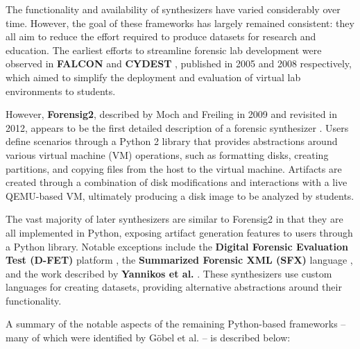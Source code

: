 The functionality and availability of synthesizers have varied
considerably over time. However, the goal of these frameworks has
largely remained consistent: they all aim to reduce the effort required
to produce datasets for research and education. The earliest efforts to
streamline forensic lab development were observed in \textbf{FALCON}
\citep{adelsteinAutomaticallyCreatingRealistic2005} and
\textbf{CYDEST} \citep{bruecknerAutomatedComputerForensics2008},
published in 2005 and 2008 respectively, which aimed to simplify the
deployment and evaluation of virtual lab environments to students.

However, \textbf{Forensig2}, described by Moch and Freiling in 2009 and
revisited in 2012, appears to be the first detailed description of a
forensic synthesizer
\citep{mochForensicImageGenerator2009,mochEvaluatingForensicImage2012}.
Users define scenarios through a Python 2 library that provides
abstractions around various virtual machine (VM) operations, such as
formatting disks, creating partitions, and copying files from the host
to the virtual machine. Artifacts are created through a combination of
disk modifications and interactions with a live QEMU-based VM,
ultimately producing a disk image to be analyzed by students.

The vast majority of later synthesizers are similar to Forensig2 in that
they are all implemented in Python, exposing artifact generation
features to users through a Python library. Notable exceptions include
the \textbf{Digital Forensic Evaluation Test (D-FET)} platform
\citep{williamCloudbasedDigitalForensics2011}, the \textbf{Summarized
Forensic XML (SFX)} language
\citep{russellForensicImageDescription2012}, and the work described
by \textbf{Yannikos et al.} \citep{yannikosDataCorporaDigital2014}.
These synthesizers use custom languages for creating datasets, providing
alternative abstractions around their functionality.

A summary of the notable aspects of the remaining Python-based
frameworks -- many of which were identified by Göbel et al.
\citep{gobelForTraceHolisticForensic2022} -- is described below:

